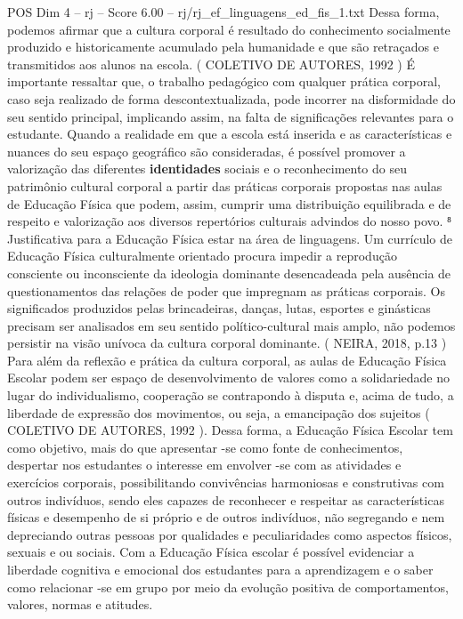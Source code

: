 \begin{textsample}{POS Dim 4 – rj – Score 6.00 – rj/rj\_ef\_linguagens\_ed\_fis\_1.txt}
Dessa forma, podemos afirmar que a cultura corporal é resultado do conhecimento socialmente produzido e historicamente acumulado pela humanidade e que são retraçados e transmitidos aos alunos na escola. ( COLETIVO DE AUTORES, 1992 ) É importante ressaltar que, o trabalho pedagógico com qualquer prática corporal, caso seja realizado de forma descontextualizada, pode incorrer na disformidade do seu sentido principal, implicando assim, na falta de significações relevantes para o estudante.
Quando a realidade em que a escola está inserida e as características e nuances do seu espaço geográfico são consideradas, é possível promover a valorização das diferentes \textbf{identidades} sociais e o reconhecimento do seu patrimônio cultural corporal a partir das práticas corporais propostas nas aulas de Educação Física que podem, assim, cumprir uma distribuição equilibrada e de respeito e valorização aos diversos repertórios culturais advindos do nosso povo. ⁸ Justificativa para a Educação Física estar na área de linguagens.
Um currículo de Educação Física culturalmente orientado procura impedir a reprodução consciente ou inconsciente da ideologia dominante desencadeada pela ausência de questionamentos das relações de poder que impregnam as práticas corporais.
Os significados produzidos pelas brincadeiras, danças, lutas, esportes e ginásticas precisam ser analisados em seu sentido político-cultural mais amplo, não podemos persistir na visão unívoca da cultura corporal dominante. ( NEIRA, 2018, p.13 ) Para além da reflexão e prática da cultura corporal, as aulas de Educação Física Escolar podem ser espaço de desenvolvimento de valores como a solidariedade no lugar do individualismo, cooperação se contrapondo à disputa e, acima de tudo, a liberdade de expressão dos movimentos, ou seja, a emancipação dos sujeitos ( COLETIVO DE AUTORES, 1992 ).
Dessa forma, a Educação Física Escolar tem como objetivo, mais do que apresentar -se como fonte de conhecimentos, despertar nos estudantes o interesse em envolver -se com as atividades e exercícios corporais, possibilitando convivências harmoniosas e construtivas com outros indivíduos, sendo eles capazes de reconhecer e respeitar as características físicas e desempenho de si próprio e de outros indivíduos, não segregando e nem depreciando outras pessoas por qualidades e peculiaridades como aspectos físicos, sexuais e ou sociais.
Com a Educação Física escolar é possível evidenciar a liberdade cognitiva e emocional dos estudantes para a aprendizagem e o saber como relacionar -se em grupo por meio da evolução positiva de comportamentos, valores, normas e atitudes.

\end{textsample}

